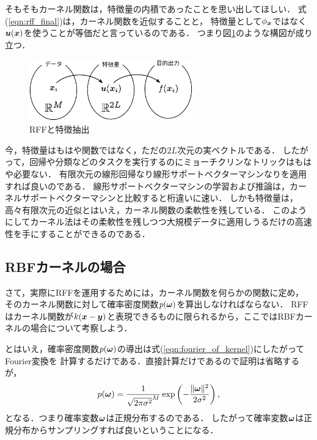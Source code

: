そもそもカーネル関数は，特徴量の内積であったことを思い出してほしい．
式(\ref{eqn:rff_final})は，カーネル関数を近似することと，
特徴量として$\phi_{\boldsymbol{x}}$ではなく$\boldsymbol{u}(\boldsymbol{x})$を使うことが等価だと言っているのである．
つまり図\ref{fig:rff_and_feature_extraction}のような構図が成り立つ．

\begin{figure}[t]
    \centerline{\includegraphics[width=200pt]{figures/rff_and_feature_extraction.pdf}}
    \caption{RFFと特徴抽出}
    \label{fig:rff_and_feature_extraction}
\end{figure}

今，特徴量はもはや関数ではなく，ただの$2L$次元の実ベクトルである．
したがって，回帰や分類などのタスクを実行するのにミョーチクリンなトリックはもはや必要ない．
有限次元の線形回帰なり線形サポートベクターマシンなりを適用すれば良いのである．
線形サポートベクターマシンの学習および推論は，カーネルサポートベクターマシンと比較すると桁違いに速い．
しかも特徴量は，高々有限次元の近似とはいえ，カーネル関数の柔軟性を残している．
このようにしてカーネル法はその柔軟性を残しつつ大規模データに適用しうるだけの高速性を手にすることができるのである．

\subsection{RBFカーネルの場合}

さて，実際にRFFを運用するためには，カーネル関数を何らかの関数に定め，
そのカーネル関数に対して確率密度関数$p(\boldsymbol{\omega})$を算出しなければならない．
RFFはカーネル関数が$k(\boldsymbol{x} - \boldsymbol{y})$と表現できるものに限られるから，ここではRBFカーネルの場合について考察しよう．

とはいえ，確率密度関数$p(\boldsymbol{\omega})$の導出は式(\ref{eqn:fourier_of_kernel})にしたがってFourier変換を
計算するだけである．直接計算だけであるので証明は省略するが，
\begin{equation}
    p(\boldsymbol{\omega}) = \frac{1}{\sqrt{2 \pi \sigma^2}^{M}} \exp \left( - \frac{\| \boldsymbol{\omega} \|^2}{2 \sigma^2} \right),
\end{equation}
となる．つまり確率変数$\boldsymbol{\omega}$は正規分布するのである．
したがって確率変数$\boldsymbol{\omega}$は正規分布からサンプリングすれば良いということになる．

